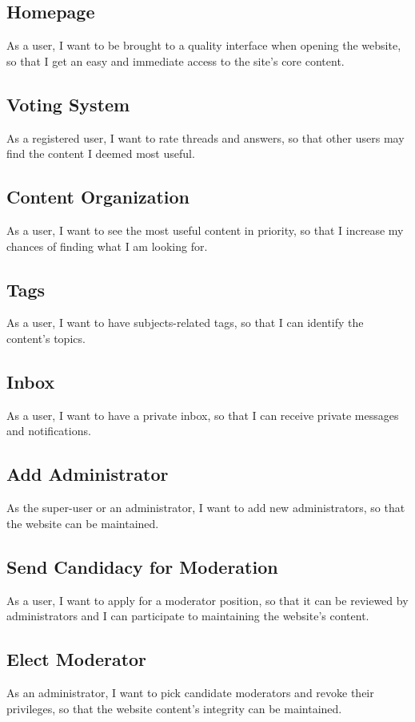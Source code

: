 \documentclass [a4paper, 12pt] {article}
\begin{document}
\subsection{Homepage}
As a user, I want to be brought to a quality interface when opening the website, so that I get an easy and immediate access to the site's core content.

\subsection{Voting System}
As a registered user, I want to rate threads and answers, so that other users may find the content I deemed most useful.

\subsection{Content Organization}
As a user, I want to see the most useful content in priority, so that I increase my chances of finding what I am looking for.

\subsection{Tags}
As a user, I want to have subjects-related tags, so that I can identify the content's topics.

\subsection{Inbox}
As a user, I want to have a private inbox, so that I can receive private messages and notifications.

\subsection{Add Administrator}
As the super-user or an administrator, I want to add new administrators, so that the website can be maintained.

\subsection{Send Candidacy for Moderation}
As a user, I want to apply for a moderator position, so that it can be reviewed by administrators and I can participate to maintaining the website's content.

\subsection{Elect Moderator}
As an administrator, I want to pick candidate moderators and revoke their privileges, so that the website content's integrity can be maintained.
\end{document}
